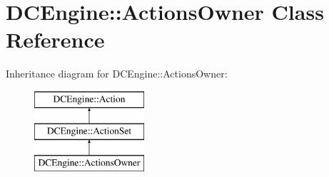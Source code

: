 \hypertarget{classDCEngine_1_1ActionsOwner}{\section{D\-C\-Engine\-:\-:Actions\-Owner Class Reference}
\label{classDCEngine_1_1ActionsOwner}
}
Inheritance diagram for D\-C\-Engine\-:\-:Actions\-Owner\-:\begin{figure}[H]
\begin{center}
\leavevmode
\includegraphics[height=3.000000cm]{classDCEngine_1_1ActionsOwner}
\end{center}
\end{figure}
